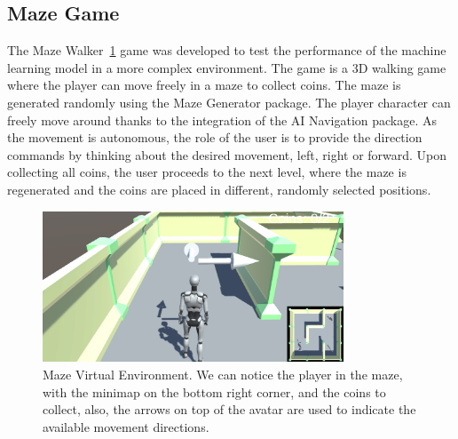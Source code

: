 \subsection*{Maze Game}
The Maze Walker~\ref{fig:maze} game was developed to test the performance of the machine learning model in a more complex environment.
The game is a 3D walking game where the player can move freely in a maze to collect coins.
The maze is generated randomly using the Maze Generator package.
The player character can freely move around thanks to the integration of the AI Navigation package.
As the movement is autonomous, the role of the user is to provide the direction commands by thinking about the desired movement, left, right or forward.
Upon collecting all coins, the user proceeds to the next level, where the maze is regenerated and the coins are placed in different, randomly selected positions.

\begin{figure}[!htbp]
    \centering
    \includegraphics[width=0.8\textwidth]{Figures/Methodology/maze}
    \caption{Maze Virtual Environment. We can notice the player in the maze, with the minimap on the bottom right corner, and the coins to collect, also, the arrows on top of the avatar are used to indicate the available movement directions.}\label{fig:maze}
\end{figure}